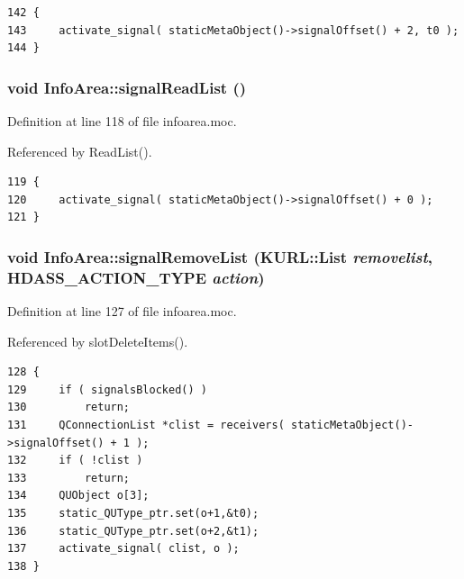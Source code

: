 \footnotesize\begin{verbatim}142 {
143     activate_signal( staticMetaObject()->signalOffset() + 2, t0 );
144 }
\end{verbatim}\normalsize 
{}
\subsubsection{\setlength{\rightskip}{0pt plus 5cm}void Info\-Area::signal\-Read\-List ()\hspace{0.3cm}{\tt  [signal]}}\label{classInfoArea_InfoAreal0}




Definition at line 118 of file infoarea.moc.

Referenced by Read\-List().



\footnotesize\begin{verbatim}119 {
120     activate_signal( staticMetaObject()->signalOffset() + 0 );
121 }
\end{verbatim}\normalsize 
{}
\subsubsection{\setlength{\rightskip}{0pt plus 5cm}void Info\-Area::signal\-Remove\-List (KURL::List {\em removelist}, {\bf HDASS\_\-ACTION\_\-TYPE} {\em action})\hspace{0.3cm}{\tt  [signal]}}\label{classInfoArea_InfoAreal1}




Definition at line 127 of file infoarea.moc.

Referenced by slot\-Delete\-Items().



\footnotesize\begin{verbatim}128 {
129     if ( signalsBlocked() )
130         return;
131     QConnectionList *clist = receivers( staticMetaObject()->signalOffset() + 1 );
132     if ( !clist )
133         return;
134     QUObject o[3];
135     static_QUType_ptr.set(o+1,&t0);
136     static_QUType_ptr.set(o+2,&t1);
137     activate_signal( clist, o );
138 }
\end{verbatim}\normalsize 
{}
